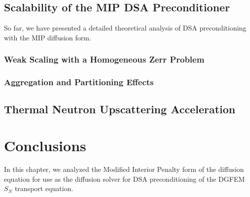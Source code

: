 \subsection{Scalability of the MIP DSA Preconditioner}
\label{sec::DSA_Results_Scaling}

So far, we have presented a detailed theoretical analysis of DSA preconditioning with the MIP diffusion form. 


\subsubsection{Weak Scaling with a Homogeneous Zerr Problem}
\label{sec::DSA_Results_Scaling_Zerr}

\subsubsection{Aggregation and Partitioning Effects}
\label{sec::DSA_Results_Scaling_Parametric}

\subsection{Thermal Neutron Upscattering Acceleration}
\label{sec::DSA_Results_IM1}

\section{Conclusions}
\label{sec::DSA_conclusions}

In this chapter, we analyzed the Modified Interior Penalty form of the diffusion equation for use as the diffusion solver for DSA preconditioning of the DGFEM $S_N$ transport equation.


